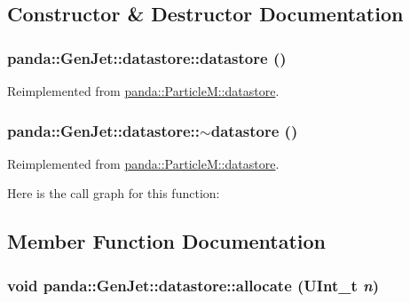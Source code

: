 \subsection{Constructor \& Destructor Documentation}
\hypertarget{structpanda_1_1GenJet_1_1datastore_ad0ca5d1b0381eb65489787ba810fa69a}{
\subsubsection[{datastore}]{\setlength{\rightskip}{0pt plus 5cm}panda::GenJet::datastore::datastore ()}}
\label{structpanda_1_1GenJet_1_1datastore_ad0ca5d1b0381eb65489787ba810fa69a}


Reimplemented from \hyperlink{structpanda_1_1ParticleM_1_1datastore_acc9af307e2c4fee9bc5d9bbb37ad6124}{panda::ParticleM::datastore}.\hypertarget{structpanda_1_1GenJet_1_1datastore_aee5add4c9f162350865cec47c322dec0}{
\subsubsection[{$\sim$datastore}]{\setlength{\rightskip}{0pt plus 5cm}panda::GenJet::datastore::$\sim$datastore ()}}
\label{structpanda_1_1GenJet_1_1datastore_aee5add4c9f162350865cec47c322dec0}


Reimplemented from \hyperlink{structpanda_1_1ParticleM_1_1datastore_ae068980c20730bc8565d2f7ea701bc5e}{panda::ParticleM::datastore}.

Here is the call graph for this function:

\subsection{Member Function Documentation}
\hypertarget{structpanda_1_1GenJet_1_1datastore_a8b05278d242cae6efa7c1cc2ed929d6a}{
\subsubsection[{allocate}]{\setlength{\rightskip}{0pt plus 5cm}void panda::GenJet::datastore::allocate (UInt\_\-t {\em n})}}
\label{structpanda_1_1GenJet_1_1datastore_a8b05278d242cae6efa7c1cc2ed929d6a}


